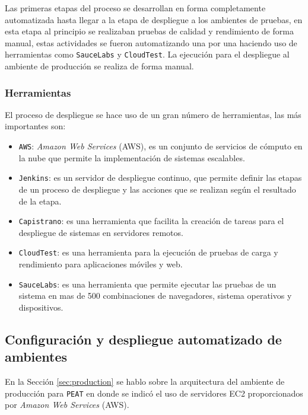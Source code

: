 
Las primeras etapas del proceso se desarrollan en forma completamente automatizada
hasta llegar a la etapa de despliegue a los ambientes de pruebas, en esta etapa
al principio se realizaban pruebas de calidad y rendimiento de forma manual, estas
actividades se fueron automatizando una por una  haciendo uso de herramientas como
\texttt{SauceLabs} y \texttt{CloudTest}. La ejecución para el despliegue al ambiente
de producción se realiza de forma manual.

\subsubsection{Herramientas}

El proceso de despliegue se hace uso de un gran número de herramientas, las más
importantes son:

\begin{itemize}
\item \texttt{AWS}: \textit{Amazon Web Services} (AWS), es un conjunto de servicios
  de cómputo en la nube que permite la implementación de sistemas escalables.
\item \texttt{Jenkins}: es un servidor de despliegue continuo, que permite
  definir las etapas de un proceso de despliegue y las acciones que se realizan
  según el resultado de la etapa.
\item \texttt{Capistrano}: es una herramienta que facilita la creación de tareas
  para el despliegue de sistemas en servidores remotos.
\item \texttt{CloudTest}: es una herramienta para la ejecución de pruebas de
  carga y rendimiento para aplicaciones móviles y web.
\item \texttt{SauceLabs}: es una herramienta que permite ejecutar las pruebas de un
  sistema en mas de 500 combinaciones de navegadores, sistema operativos
  y dispositivos.
\end{itemize}

\subsection{Configuración y despliegue automatizado de ambientes}

En la Sección \ref{sec:production} se hablo sobre la arquitectura del ambiente
de producción para \texttt{PEAT} en donde se indicó el uso de servidores EC2
proporcionados por \textit{Amazon Web Services} (AWS).

